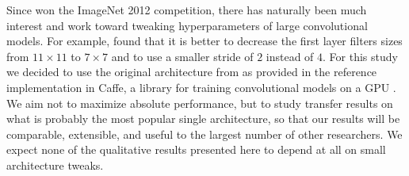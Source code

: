Since \cite{Krizhevsky-2012} won the ImageNet 2012 competition, there has naturally been much interest and work toward tweaking hyperparameters of large convolutional models. For example, \cite{Zeiler+et+al-arxiv2013b} found that it is better to decrease the first layer filters sizes from $11\times 11$ to $7\times 7$ and to use a smaller stride of $2$ instead of $4$.
For this study we decided to use the original architecture from \cite{Krizhevsky-2012} as provided in the reference implementation in Caffe, a library for training convolutional models on a GPU \citep{Jia13caffe}.
We aim not to maximize absolute performance, but to study transfer results on what is probably the most popular single architecture, so that our results will be comparable, extensible, and useful to the largest number of other researchers.
We expect none of the qualitative results presented here to depend at all on small architecture tweaks.




